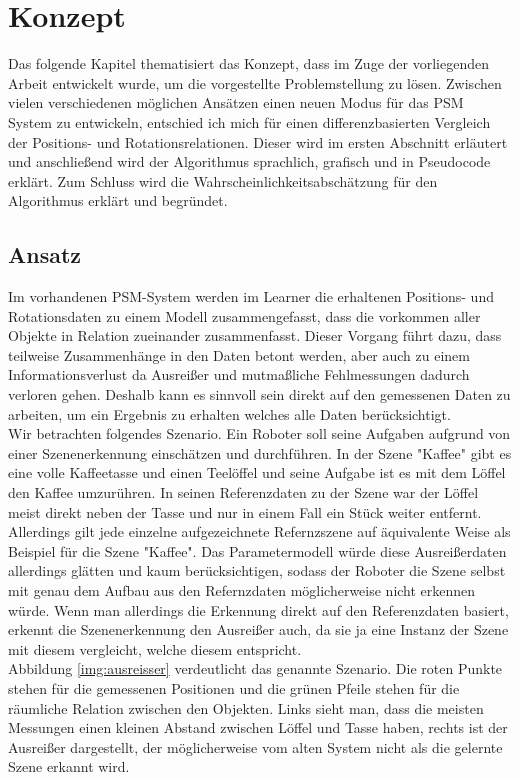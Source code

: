 \chapter{Konzept}\label{ch:konzept}
Das folgende Kapitel thematisiert das Konzept, dass im Zuge der vorliegenden Arbeit entwickelt wurde, um die vorgestellte Problemstellung zu lösen. Zwischen vielen verschiedenen möglichen Ansätzen einen neuen Modus für das PSM System zu entwickeln, entschied ich mich für einen differenzbasierten Vergleich der Positions- und Rotationsrelationen. Dieser wird im ersten Abschnitt erläutert und anschließend wird der Algorithmus sprachlich, grafisch und in Pseudocode erklärt. Zum Schluss wird die Wahrscheinlichkeitsabschätzung für den Algorithmus erklärt und begründet.
\section{Ansatz}
Im vorhandenen PSM-System werden im Learner die erhaltenen Positions- und Rotationsdaten zu einem Modell zusammengefasst, dass die vorkommen aller Objekte in Relation zueinander zusammenfasst. Dieser Vorgang führt dazu, dass teilweise Zusammenhänge in den Daten betont werden, aber auch zu einem Informationsverlust da Ausreißer und mutmaßliche Fehlmessungen dadurch verloren gehen. Deshalb kann es sinnvoll sein direkt auf den gemessenen Daten zu arbeiten, um ein Ergebnis zu erhalten welches alle Daten berücksichtigt. \smallskip\\
Wir betrachten folgendes Szenario. Ein Roboter soll seine Aufgaben aufgrund von einer Szenenerkennung einschätzen und durchführen. In der Szene "Kaffee" gibt es eine volle Kaffeetasse und einen Teelöffel und seine Aufgabe ist es mit dem Löffel den Kaffee umzurühren. In seinen Referenzdaten zu der Szene war der Löffel meist direkt neben der Tasse und nur in einem Fall ein Stück weiter entfernt. Allerdings gilt jede einzelne aufgezeichnete Refernzszene auf äquivalente Weise als Beispiel für die Szene "Kaffee". Das Parametermodell würde diese Ausreißerdaten allerdings glätten und kaum berücksichtigen, sodass der Roboter die Szene selbst mit genau dem Aufbau aus den Refernzdaten möglicherweise nicht erkennen würde. Wenn man allerdings die Erkennung direkt auf den Referenzdaten basiert, erkennt die Szenenerkennung den Ausreißer auch, da sie ja eine Instanz der Szene mit diesem vergleicht, welche diesem entspricht.\cite{fepezi03}\smallskip\\
Abbildung \ref{img:ausreisser} verdeutlicht das genannte Szenario. Die roten Punkte stehen für die gemessenen Positionen und die grünen Pfeile stehen für die räumliche Relation zwischen den Objekten. Links sieht man, dass die meisten Messungen einen kleinen Abstand zwischen Löffel und Tasse haben, rechts ist der Ausreißer dargestellt, der möglicherweise vom alten System nicht als die gelernte Szene erkannt wird.\smallskip\\

